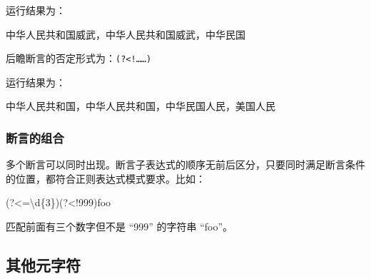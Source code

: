\documentclass[]{ctexbook}
\newenvironment{Shaded}{\begin{snugshade}}{\end{snugshade}}
\newcommand{\CommentTok}[1]{\textcolor[rgb]{0.56,0.35,0.01}{\textit{#1}}}
\newcommand{\DecValTok}[1]{\textcolor[rgb]{0.00,0.00,0.81}{#1}}
\newcommand{\FunctionTok}[1]{\textcolor[rgb]{0.00,0.00,0.00}{#1}}
\newcommand{\KeywordTok}[1]{\textcolor[rgb]{0.13,0.29,0.53}{\textbf{#1}}}
\newcommand{\NormalTok}[1]{#1}
\newcommand{\OtherTok}[1]{\textcolor[rgb]{0.56,0.35,0.01}{#1}}
\newcommand{\StringTok}[1]{\textcolor[rgb]{0.31,0.60,0.02}{#1}}
\begin{document}
运行结果为：

\begin{Shaded}
\begin{Highlighting}[]
\NormalTok{中华人民共和国威武，中华人民共和国威武，中华民国}
\end{Highlighting}
\end{Shaded}

后瞻断言的否定形式为：\texttt{(?\textless{}!\ldots{}\ldots{})}

\begin{Shaded}
\end{Shaded}

运行结果为：

\begin{Shaded}
\begin{Highlighting}[]
\NormalTok{中华人民共和国，中华人民共和国，中华民国人民，美国人民}
\end{Highlighting}
\end{Shaded}

\hypertarget{ux65adux8a00ux7684ux7ec4ux5408}{%
\subsubsection{断言的组合}\label{ux65adux8a00ux7684ux7ec4ux5408}}

多个断言可以同时出现。断言子表达式的顺序无前后区分，只要同时满足断言条件的位置，都符合正则表达式模式要求。比如：

\begin{Shaded}
\begin{Highlighting}[]
\OtherTok{(?}\NormalTok{<=\textbackslash{}d\{}\DecValTok{3}\NormalTok{\}}\OtherTok{)(?}\NormalTok{<!}\DecValTok{999}\OtherTok{)}\NormalTok{foo}
\end{Highlighting}
\end{Shaded}

匹配前面有三个数字但不是 ``999'' 的字符串 ``foo''。

\hypertarget{ux5176ux4ed6ux5143ux5b57ux7b26}{%
\subsection{其他元字符}\label{ux5176ux4ed6ux5143ux5b57ux7b26}}
\end{document}
